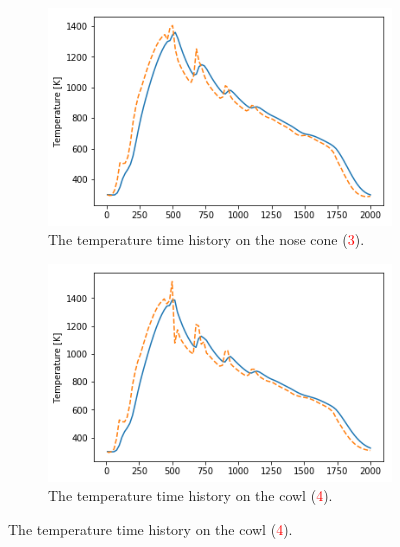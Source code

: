 \begin{figure}[!ht]
\begin{subfigure}{.5\textwidth}
	\end{subfigure}
	\begin{subfigure}{.5\textwidth}
		\centering
		\includegraphics[width=0.99\linewidth]{figures/A1_uncertainty-analysis/TPos1Return}
		\caption{The temperature time history on the nose cone (\textcolor{red}{3}).}
		
	\end{subfigure}
	\begin{subfigure}{.5\textwidth}
		\centering
		\includegraphics[width=0.99\linewidth]{figures/A1_uncertainty-analysis/TPos2Return}
		\caption{The temperature time history on the cowl (\textcolor{red}{4}).}
		

\end{subfigure}
\end{figure}
